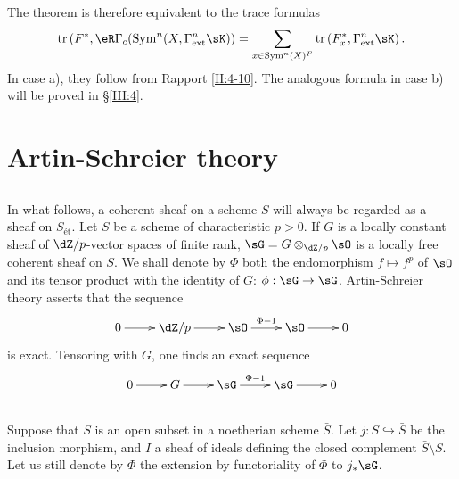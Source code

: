 \subsection{}\label{III:2-13}

The theorem is therefore equivalent to the trace formulas
\[
  \tr\left(F^*,\eR\Gamma_c(\operatorname{Sym}^n(X,\Gamma_\text{ext}^n \sK)\right) = \sum_{x\in\operatorname{Sym}^n(X)^F} \tr\left(F_x^*,\Gamma_\text{ext}^n\sK\right) \text{.}
\]
In case a), they follow from Rapport \ref{II:4-10}. The analogous
formula in case b) will be proved in \S\ref{III:4}.










\section{Artin-Schreier theory}\label{III:3}




\subsection{}\label{III:3-1}

In what follows, a coherent sheaf on a scheme $S$ will always be
regarded as a sheaf on $S_\text{\'et}$. Let $S$ be a scheme of
characteristic $p>0$. If $G$ is a locally constant sheaf of
$\dZ/p$-vector spaces of finite rank, $\sG=G\otimes_{\dZ/p}\sO$ is a
locally free coherent sheaf on $S$. We shall denote by $\Phi$ both the endomorphism
$f\mapsto f^p$ of $\sO$ and its tensor product with the identity of
$G$: $\phi:\sG\to\sG$. Artin-Schreier theory \cite[IX 3.5]{sga4}
asserts that the sequence
\[\xymatrix{
  0 \ar[r]
    & \dZ/p \ar[r]
    & \sO \ar[r]^-{\Phi-1}
    & \sO \ar[r]
    & 0
}\]
is exact. Tensoring with $G$, one finds an exact sequence
\[\xymatrix{
  0 \ar[r]
    & G \ar[r]
    & \sG \ar[r]^-{\Phi-1}
    & \sG \ar[r]
    & 0
}\]




\subsection{}\label{III:3-2}

Suppose that $S$ is an open subset in a noetherian scheme $\bar S$.
Let $j:S\hookrightarrow \bar S$ be the inclusion morphism, and $I$ a
sheaf of ideals defining the closed complement
$\bar S\setminus S$. Let us still denote by $\Phi$ the extension by functoriality
of $\Phi$ to $j_*\sG$.




